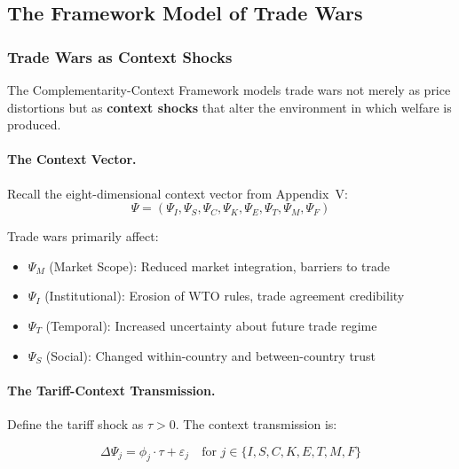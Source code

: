 \subsection{The Framework Model of Trade Wars}

\subsubsection{Trade Wars as Context Shocks}

The Complementarity-Context Framework models trade wars not merely as price 
distortions but as \textbf{context shocks} that alter the environment in which 
welfare is produced.

\paragraph{The Context Vector.}
Recall the eight-dimensional context vector from Appendix~V:
\begin{equation}
\Psi = (\Psi_I, \Psi_S, \Psi_C, \Psi_K, \Psi_E, \Psi_T, \Psi_M, \Psi_F)
\end{equation}

Trade wars primarily affect:
\begin{itemize}
    \item $\Psi_M$ (Market Scope): Reduced market integration, barriers to trade
    \item $\Psi_I$ (Institutional): Erosion of WTO rules, trade agreement credibility
    \item $\Psi_T$ (Temporal): Increased uncertainty about future trade regime
    \item $\Psi_S$ (Social): Changed within-country and between-country trust
\end{itemize}

\paragraph{The Tariff-Context Transmission.}
Define the tariff shock as $\tau > 0$. The context transmission is:

\begin{equation}
\Delta \Psi_j = \phi_j \cdot \tau + \varepsilon_j \quad \text{for } j \in \{I, S, C, K, E, T, M, F\}
\label{eq:tariff-context}
\end{equation}


